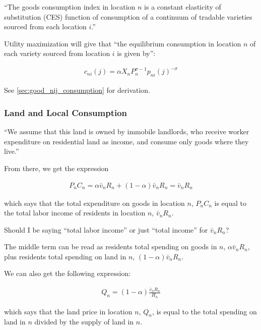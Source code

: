 \documentclass[10pt]{article}
\begin{document}
``The goods consumption index in location $n$ is a constant elasticity of 
substitution (CES) function of consumption of a continuum of tradable 
varieties sourced from each location $i$.''

Utility maximization 
will give that ``the equilibrium consumption 
in location $n$ of each variety sourced from 
location $i$ 
is given by'':

\begin{align}
    c_{n i}(j)=\alpha X_n P_n^{\sigma-1} p_{n i}(j)^{-\sigma} \label{eq:good_nij_consumption}
\end{align}

See \autoref{sec:good_nij_consumption} for derivation.

\subsubsection{Land and Local Consumption}

``We assume that this land is owned by immobile landlords,
who receive worker expenditure on residential land as income, and consume only
goods where they live.''

From there, we get the expression

\begin{align}
    P_n C_n=\alpha \bar{v}_n R_n+(1-\alpha) \bar{v}_n R_n=\bar{v}_n R_n \label{eq:land_and_local_consumption}
\end{align}

which says that the 
total expenditure on goods in location $n$, $P_n C_n$
is equal to the total labor income of 
residents in location $n$, $\bar{v}_n R_n$.

\begin{questions}
    Should I be saying ``total labor income'' or just ``total income''
    for $\bar{v}_n R_n$?
\end{questions}

The middle term can be read as 
residents total spending on goods in $n$,
$\alpha \bar{v}_n R_n$, plus 
residents total spending on land in $n$,
$(1-\alpha) \bar{v}_n R_n$.

We can also get the following expression:

\begin{align}
    Q_n=(1-\alpha) \frac{\bar{v}_n R_n}{H_n}
\end{align}

which says that 
the land price in location $n$, $Q_n$,
is equal to the total spending on land in $n$ 
divided by the supply of land in $n$.
\end{document}
